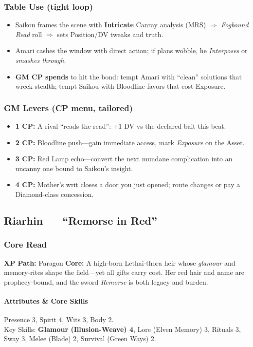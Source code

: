 \subsubsection{Table Use (tight loop)}
\begin{itemize}
  \item Saikou frames the scene with \textbf{Intricate} Canray analysis (MRS) $\Rightarrow$ \emph{Fogbound Read} roll $\Rightarrow$ sets Position/DV tweaks and truth.
  \item Amari cashes the window with direct action; if plans wobble, he \emph{Interposes} or \emph{smashes through}.
  \item \textbf{GM CP spends} to hit the bond: tempt Amari with “clean” solutions that wreck stealth; tempt Saikou with Bloodline favors that cost Exposure.
\end{itemize}

\subsubsection{GM Levers (CP menu, tailored)}
\begin{itemize}
  \item \textbf{1 CP:} A rival “reads the read”: +1 DV vs the declared bait this beat.
  \item \textbf{2 CP:} Bloodline push—gain immediate access, mark \emph{Exposure} on the Asset.
  \item \textbf{3 CP:} Red Lamp echo—convert the next mundane complication into an uncanny one bound to Saikou’s insight.
  \item \textbf{4 CP:} Mother’s writ closes a door you just opened; route changes or pay a Diamond-class concession.
\end{itemize}

\subsection{Riarhin — “Remorse in Red”}

\subsubsection{Core Read}
\textbf{XP Path:} Paragon \quad
\textbf{Core:} A high-born Lethai-thora heir whose \emph{glamour} and memory-rites shape the field—yet all gifts carry cost. Her red hair and name are prophecy-bound, and the sword \emph{Remorse} is both legacy and burden.

\paragraph{Attributes \& Core Skills}
Presence 3, Spirit 4, Wits 3, Body 2.\\
Key Skills: \textbf{Glamour (Illusion-Weave) 4}, Lore (Elven Memory) 3, Rituals 3, Sway 3, Melee (Blade) 2, Survival (Green Ways) 2.

